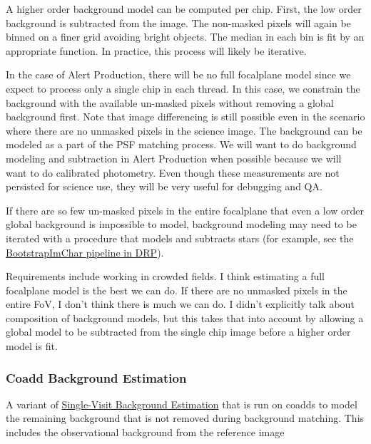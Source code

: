 A higher order background model can be computed per chip.  First, the low order background is subtracted from the image.  The non-masked pixels will again be binned on a finer grid avoiding bright objects.  The median in each bin is fit by an appropriate function.  In practice, this process will likely be iterative.

In the case of Alert Production, there will be no full focalplane model since we expect to process only a single chip in each thread.  In this case, we constrain the background with the available un-masked pixels without removing a global background first.  Note that image differencing is still possible even in the scenario where there are no unmasked pixels in the science image.  The background can be modeled as a part of the PSF matching process.  We will want to do background modeling and subtraction in Alert Production when possible because we will want to do calibrated photometry.  Even though these measurements are not persisted for science use, they will be very useful for debugging and QA.

If there are so few un-masked pixels in the entire focalplane that even a low order global background is impossible to model, background modeling may need to be iterated with a procedure that models and subtracts stars (for example, see the \hyperref[sec:drpBootstrapImChar]{BootstrapImChar pipeline in DRP}).

\begin{note}
Requirements include working in crowded fields.  I think estimating a full focalplane model is the best we can do.  If there are no unmasked pixels in the entire FoV, I don't think there is much we can do.
I didn't explicitly talk about composition of background models, but this takes that into account by allowing a global model to be subtracted from the single chip image before a higher order model is fit.
\end{note}

\subsubsection{Coadd Background Estimation}
\label{sec:acCoaddBackgroundEstimation}

A variant of \hyperref[sec:acSingleVisitBackgroundEstimation]{Single-Visit Background Estimation} that is run on coadds to model the remaining background that is not removed during background matching.  This includes the observational background from the reference image

